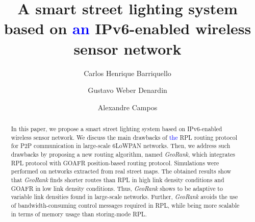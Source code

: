 \documentclass[authoryear,preprint,review,12pt]{elsarticle}
\newcommand{\rev}{\textcolor{blue}}
\begin{document}
\begin{frontmatter}



\title{A smart street lighting system based on \rev{an} IPv6-enabled wireless sensor network}


\author[addr1]{Carlos Henrique Barriquello}
\author[addr2]{Gustavo Weber Denardin}
\author[addr1]{Alexandre Campos}
\address[addr1]{Electronic Ballast Researching Group (GEDRE) - Intelligence in Lighting, Federal University of Santa Maria(UFSM), Santa Maria, RS, 97105-900, Brazil}
\address[addr2]{Technological Federal University of Paran$\acute{a}$, Pato Branco, PR, 85503-390, Brazil}


\begin{abstract}
In this paper, we propose a smart street lighting system based on IPv6-enabled wireless sensor network. We discuss the main drawbacks of \rev{the} RPL routing protocol for P2P communication in large-scale 6LoWPAN networks. Then, we address such drawbacks by proposing a new routing algorithm, named \textit{GeoRank}, which integrates RPL protocol with GOAFR position-based routing protocol. Simulations were performed on networks extracted from real street maps. The obtained results show that \textit{GeoRank} finds shorter routes than RPL in high link density conditions and GOAFR in low link density conditions. Thus, \textit{GeoRank} shows to be adaptive to variable link densities found in large-scale networks. Further, \textit{GeoRank} avoids the use of bandwidth-consuming control messages required in RPL, while being more scalable in terms of memory usage than storing-mode RPL.
\end{abstract}



\end{frontmatter}
\end{document}
